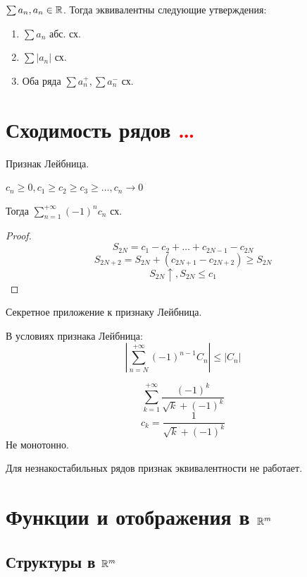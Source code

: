 \begin{theorem}
    $\sum a_n, a_n\in\mathbb{R}$. Тогда эквивалентны следующие утверждения:
    \begin{enumerate}
        \item $\sum a_n$ абс. сх.
        \item $\sum |a_n|$ сх.
        \item Оба ряда $\sum a_n^+, \sum a_n^-$ сх. 
    \end{enumerate}
\end{theorem}

\section*{Сходимость рядов \textcolor{red}{\ldots}}

\begin{theorem}
    Признак Лейбница.

    $c_n\ge 0, c_1\ge c_2\ge c_3 \ge \ldots, c_n\to 0$

    Тогда $\sum_{n=1}^{+\infty} (-1)^n c_n$ сх.
\end{theorem}
\begin{proof}
    $$S_{2N}=c_1-c_2+\ldots + c_{2N-1}-c_{2N}$$
    $$S_{2N+2}=S_{2N}+(c_{2N+1}-c_{2N+2})\geq S_{2N}$$
    $$S_{2N}\uparrow, S_{2N}\leq c_1$$
\end{proof}

\begin{remark}
    Секретное приложение к признаку Лейбница.

    В условиях признака Лейбница:
    $$\left|\sum_{n=N}^{+\infty} (-1)^{n-1}C_n\right| \le |C_n|$$
\end{remark}

\begin{example}
    $$\sum_{k=1}^{+\infty} \frac{(-1)^k}{\sqrt k + (-1)^k}$$
    $$c_k=\frac{1}{\sqrt k + (-1)^k}$$
    Не монотонно.
\end{example}

Для незнакостабильных рядов признак эквивалентности не работает.

\section*{Функции и отображения в $\mathbb{R}^m$}

\subsection{Структуры в $\mathbb{R}^m$}


